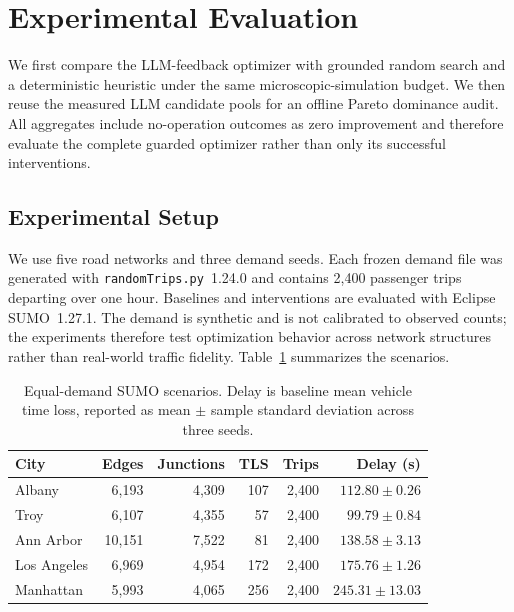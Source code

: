 
\section{Experimental Evaluation}
\label{sec:experiments}

We first compare the LLM-feedback optimizer with grounded random search and a
deterministic heuristic under the same microscopic-simulation budget.  We then
reuse the measured LLM candidate pools for an offline Pareto dominance audit.
All aggregates include no-operation outcomes as
zero improvement and therefore evaluate the complete guarded optimizer rather
than only its successful interventions.

\subsection{Experimental Setup}
\label{sec:experimental-setup}

We use five road networks and three demand seeds.  Each frozen demand file was
generated with \texttt{randomTrips.py}~1.24.0 and contains 2,400 passenger trips
departing over one hour.  Baselines and interventions are evaluated with
Eclipse SUMO~1.27.1.  The demand is synthetic and is not calibrated to observed
counts; the experiments therefore test optimization behavior across network
structures rather than real-world traffic fidelity.  Table~\ref{tab:scenario-summary}
summarizes the scenarios.

\begin{table}[!ht]
  \caption{Equal-demand SUMO scenarios. Delay is baseline mean vehicle time
  loss, reported as mean $\pm$ sample standard deviation across three seeds.}
  \label{tab:scenario-summary}
  \begin{center}
    \begin{tabular}{lrrrrr}
      \hline
      City & Edges & Junctions & TLS & Trips & Delay (s) \\
      \hline
      Albany      &  6,193 & 4,309 & 107 & 2,400 & $112.80 \pm 0.26$ \\
      Troy        &  6,107 & 4,355 &  57 & 2,400 & $ 99.79 \pm 0.84$ \\
      Ann Arbor   & 10,151 & 7,522 &  81 & 2,400 & $138.58 \pm 3.13$ \\
      Los Angeles &  6,969 & 4,954 & 172 & 2,400 & $175.76 \pm 1.26$ \\
      Manhattan   &  5,993 & 4,065 & 256 & 2,400 & $245.31 \pm 13.03$ \\
      \hline
    \end{tabular}
  \end{center}
\end{table}

